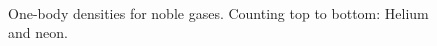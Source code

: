 \begin{frame}
\begin{figure}
\begin{center}
     \\
  \caption{One-body densities for noble gases. Counting top to bottom: Helium and neon. }
  \label{fig:OBD_noble_Atoms_2D_combo}
 \end{center}
\end{figure}
\end{frame}



